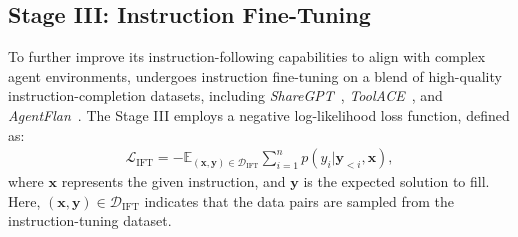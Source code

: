 \subsection{Stage III: Instruction Fine-Tuning}
\label{sec:method-ift}
To further improve its instruction-following capabilities to align with complex agent environments, \method undergoes instruction fine-tuning on a blend of high-quality instruction-completion datasets, including \emph{ShareGPT}~\cite{chiang2023vicuna}, \emph{ToolACE}~\cite{liu2024toolace}, and \emph{AgentFlan}~\cite{chen2024agent}. 
The Stage III employs a negative log-likelihood loss function, defined as:
\begin{equation*}
    \begin{aligned}
        \mathcal{L}_{\text{IFT}}=-\mathbb{E}_{(\mathbf{x},\mathbf{y})\in\mathcal{D}_{\text{IFT}}}\sum_{i=1}^np(y_i|\mathbf{y}_{<i},\mathbf{x}),
    \end{aligned}
\end{equation*}
where $\mathbf{x}$ represents the given instruction, and $\mathbf{y}$ is the expected solution to fill. Here, $(\mathbf{x},\mathbf{y})\in\mathcal{D}_{\text{IFT}}$ indicates that the data pairs are sampled from the instruction-tuning dataset. 
